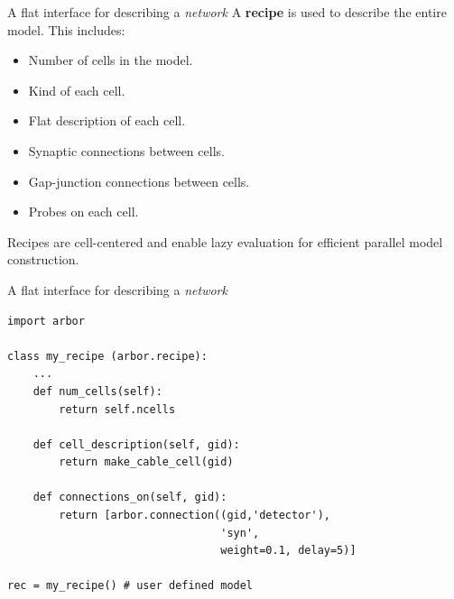 \documentclass[aspectratio=43]{beamer}
\begin{document}
\begin{frame}[fragile]{A flat interface for describing a \emph{network}}
    A \textbf{recipe} is used to describe the entire model. This includes: 
    \begin{itemize}
        \item Number of cells in the model.
        \item Kind of each cell.
        \item Flat description of each cell.
        \item Synaptic connections between cells.
        \item Gap-junction connections between cells.
        \item Probes on each cell. 
    \end{itemize}
    Recipes are cell-centered and enable lazy evaluation for efficient parallel model construction.
\end{frame}

\begin{frame}[fragile]{A flat interface for describing a \emph{network}}
    \begin{lstlisting}[style=talkpython]
import arbor

class my_recipe (arbor.recipe):
    ...
    def num_cells(self):
        return self.ncells

    def cell_description(self, gid):
        return make_cable_cell(gid)

    def connections_on(self, gid):
        return [arbor.connection((gid,'detector'), 
                                 'syn', 
                                 weight=0.1, delay=5)]

rec = my_recipe() # user defined model
    \end{lstlisting}
\end{frame}
\end{document}
